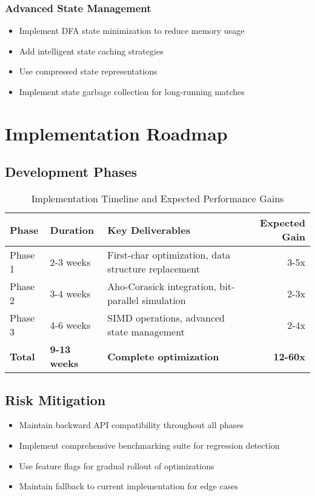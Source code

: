 \documentclass[11pt,a4paper]{article}
\begin{document}
\subsubsection{Advanced State Management}

\begin{itemize}
\item Implement DFA state minimization to reduce memory usage
\item Add intelligent state caching strategies
\item Use compressed state representations
\item Implement state garbage collection for long-running matches
\end{itemize}

\section{Implementation Roadmap}

\subsection{Development Phases}

\begin{table}[htbp]
\centering
\begin{tabular}{@{}lllr@{}}
\toprule
\textbf{Phase} & \textbf{Duration} & \textbf{Key Deliverables} & \textbf{Expected Gain} \\
\midrule
Phase 1 & 2-3 weeks & First-char optimization, data structure replacement & 3-5x \\
Phase 2 & 3-4 weeks & Aho-Corasick integration, bit-parallel simulation & 2-3x \\
Phase 3 & 4-6 weeks & SIMD operations, advanced state management & 2-4x \\
\midrule
\textbf{Total} & \textbf{9-13 weeks} & \textbf{Complete optimization} & \textbf{12-60x} \\
\bottomrule
\end{tabular}
\caption{Implementation Timeline and Expected Performance Gains}
\label{tab:roadmap}
\end{table}

\subsection{Risk Mitigation}

\begin{itemize}
\item Maintain backward API compatibility throughout all phases
\item Implement comprehensive benchmarking suite for regression detection
\item Use feature flags for gradual rollout of optimizations
\item Maintain fallback to current implementation for edge cases
\end{itemize}
\end{document}

